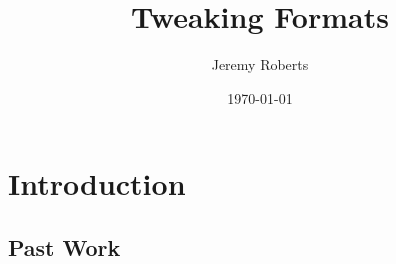 \documentclass[12pt]{article}
\title{Tweaking Formats}
\author{Jeremy Roberts}
\date{\today}
\begin{document}
\maketitle
\section{Introduction}
\blindtext[1]
\subsection{Past Work}
\blindtext[2]
\end{document}
